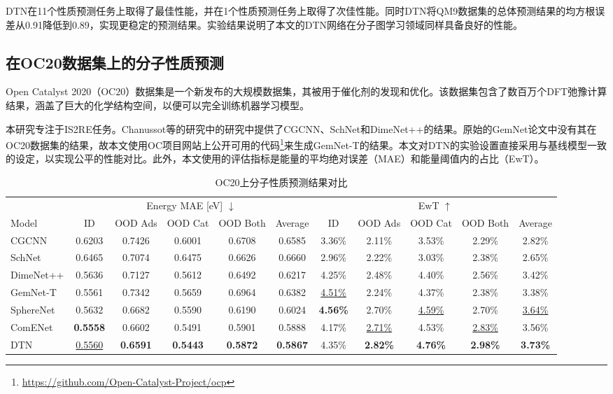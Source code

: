 DTN在11个性质预测任务上取得了最佳性能，并在1个性质预测任务上取得了次佳性能。同时DTN将QM9数据集的总体预测结果的均方根误差从0.91降低到0.89，实现更稳定的预测结果。实验结果说明了本文的DTN网络在分子图学习领域同样具备良好的性能。

\subsection{在OC20数据集上的分子性质预测}
Open Catalyst 2020（OC20）数据集\cite{oc20_chanussot_21}是一个新发布的大规模数据集，其被用于催化剂的发现和优化。该数据集包含了数百万个DFT弛豫计算结果，涵盖了巨大的化学结构空间，以便可以完全训练机器学习模型。

本研究专注于IS2RE任务。Chanussot等\cite{oc20_chanussot_21}的研究中的研究中提供了CGCNN、SchNet和DimeNet++的结果。原始的GemNet论文中没有其在OC20数据集的结果，故本文使用OC项目网站上公开可用的代码\footnote{\url{https://github.com/Open-Catalyst-Project/ocp}}来生成GemNet-T的结果。本文对DTN的实验设置直接采用与基线模型一致的设定，以实现公平的性能对比。此外，本文使用的评估指标是能量的平均绝对误差（MAE）和能量阈值内的占比（EwT）。

\begin{table}[h]
    \begin{center}
    \caption{OC20上分子性质预测结果对比}
    \label{tab:reg_oc20}
    \resizebox{\textwidth}{!}
    {\begin{tabular}{l ccccc | ccccc  }
    \bottomrule
    &\multicolumn{5}{c|}{Energy MAE [eV] $\downarrow$} & \multicolumn{5}{c}{EwT $\uparrow$}  \\
    \cmidrule(l{4pt}r{4pt}){2-6}
    \cmidrule(l{4pt}r{4pt}){7-11}
    Model & ID &  OOD Ads & OOD Cat & OOD Both &Average& ID &  OOD Ads & OOD Cat & OOD Both &Average\\
    \midrule
    CGCNN 
    & 0.6203 & 0.7426 & 0.6001& 0.6708& 0.6585
    & 3.36\% & 2.11\% & 3.53\% & 2.29\% & 2.82\% \\
    SchNet
    & 0.6465 & 0.7074& 0.6475 & 0.6626& 0.6660
    & 2.96\% & 2.22\% &3.03\%& 2.38\% & 2.65\% \\
    DimeNet++
    & 0.5636 & 0.7127 & 0.5612& 0.6492& 0.6217
    & 4.25\% & 2.48\%& 4.40\%& 2.56\% & 3.42\%\\
    GemNet-T
    & 0.5561 & 0.7342 & 0.5659& 0.6964& 0.6382
    & \underline{4.51\%} & 2.24\%& 4.37\%& 2.38\% & 3.38\%\\
    SphereNet
    & 0.5632 & 0.6682 & 0.5590 & 0.6190 & 0.6024
    & \textbf{4.56\%} & 2.70\% & \underline{4.59\%} & 2.70\% & \underline{3.64\%} \\
    ComENet
    & \textbf{0.5558} & 0.6602 & 0.5491 & 0.5901 & 0.5888
    & 4.17\% & \underline{2.71\%} & 4.53\% & \underline{2.83\%} & 3.56\% \\
    DTN
    & \underline{0.5560} & \textbf{0.6591} & \textbf{0.5443} & \textbf{0.5872} & \textbf{0.5867}
    & 4.35\% & \textbf{2.82\%} & \textbf{4.76\%} & \textbf{2.98\%} & \textbf{3.73\%} \\
    \bottomrule
    \end{tabular}}
    \vspace{-10pt}
    \end{center}
\end{table}


